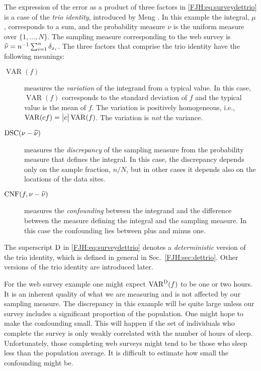 \documentclass[graybox,footinfo]{svmult}
\DeclareMathOperator{\algn}{CNF}
\DeclareMathOperator{\disc}{DSC}
\DeclareMathOperator{\Var}{VAR}
\begin{document}
The expression of the error as a product of three factors in 
\eqref{FJH:eq:surveydettrio} is a case of the \emph{trio identity}, introduced by Meng 
\cite{Men16a}.  In this example the integral, $\mu$, corresponds to a sum, 
and the probability measure $\nu$ is the uniform measure over $\{1, 
\ldots, N\}$.  The sampling measure corresponding to the web survey is $\widehat{\nu} = 
n^{-1} \sum_{i=1}^n \delta_{x_i}$.  The three factors that comprise the trio identity have 
the 
following meanings:
\begin{description}
	\item[$\Var(f)$] measures the \emph{variation} of the integrand from a typical value. 
	In 	this case, $\Var(f)$ corresponds to the standard deviation of $f$ and the typical 
	value	is the mean of $f$. The variation is positively homogeneous, i.e., $\Var(cf)  = 
	\abs{c} \Var(f)$.  The variation is \emph{not} the variance.
	\item [$\disc(\nu - \hnu)$] measures the \emph{discrepancy} of the sampling 
	measure 
	from the probability measure that defines the integral.  In this case, the discrepancy 
	depends only on the sample fraction, $n/N$, but in other cases it depends also on the 
	locations of the data sites.
	\item [$\algn(f,\nu - \hnu)$] measures the \emph{confounding} between the 
	integrand and the difference between the measure defining the integral and the 
	sampling measure.  In this case the confounding lies between plus and minus one.
\end{description}
The superscript $\textup{D}$ in \eqref{FJH:eq:surveydettrio} denotes a \emph{deterministic} 
version of the trio identity, which is defined in general in Sec.\ \ref{FJH:sec:dettrio}. 
Other versions of the trio identity are introduced later.

\begin{FJHLesson}
	\FJHLessonZero
\end{FJHLesson}

For the web survey example one might expect $\Var^\Dt(f)$ to be one or two hours.  It 
is an inherent quality of what we are measuring and is not affected by our sampling 
measure.  The discrepancy in this example will be quite large unless our survey includes a 
significant proportion of the population.  One might hope to make  the confounding 
small.  This will happen if the set of individuals who complete the survey 
is only weakly correlated with the number of hours of sleep.  Unfortunately, those  
completing web surveys might tend to be those who sleep less than the 
population average.  It is difficult to estimate how small the confounding might be.  
\end{document}
